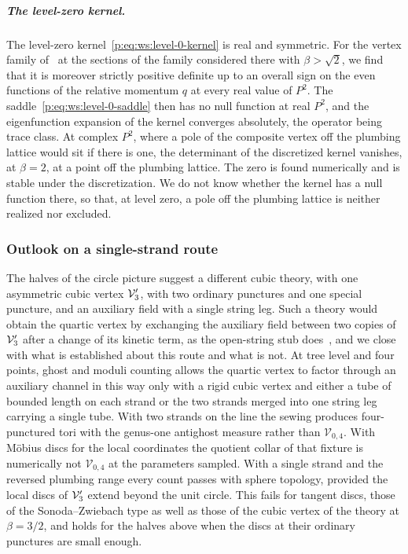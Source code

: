 \subparagraph{The level-zero kernel.}

The level-zero kernel~\eqref{p:eq:ws:level-0-kernel} is real and symmetric.
For the vertex family of~\cite{Erbin:2026:SL2CVerticesClosed} at the sections of the family considered there with $\beta > \sqrt{2}$, we find that it is moreover strictly positive definite up to an overall sign on the even functions of the relative momentum $q$ at every real value of $P^2$.
The saddle~\eqref{p:eq:ws:level-0-saddle} then has no null function at real $P^2$, and the eigenfunction expansion of the kernel converges absolutely, the operator being trace class.
At complex $P^2$, where a pole of the composite vertex off the plumbing lattice would sit if there is one, the determinant of the discretized kernel vanishes, at $\beta = 2$, at a point off the plumbing lattice.
The zero is found numerically and is stable under the discretization.
We do not know whether the kernel has a null function there, so that, at level zero, a pole off the plumbing lattice is neither realized nor excluded.

\subsubsection{Outlook on a single-strand route}
\label{p:sec:ws:single-strand}



The halves of the circle picture suggest a different cubic theory, with one asymmetric cubic vertex $\mathcal{V}_{3}'$, with two ordinary punctures and one special puncture, and an auxiliary field with a single string leg.
Such a theory would obtain the quartic vertex by exchanging the auxiliary field between two copies of $\mathcal{V}_{3}'$ after a change of its kinetic term, as the open-string stub does~\cite{Erbin:2024:OpenStringStub}, and we close with what is established about this route and what is not.
At tree level and four points, ghost and moduli counting allows the quartic vertex to factor through an auxiliary channel in this way only with a rigid cubic vertex and either a tube of bounded length on each strand or the two strands merged into one string leg carrying a single tube.
With two strands on the line the sewing produces four-punctured tori with the genus-one antighost measure rather than $\mathcal V_{0,4}$.
With Möbius discs for the local coordinates the quotient collar of that fixture is numerically not $\mathcal V_{0,4}$ at the parameters sampled.
With a single strand and the reversed plumbing range every count passes with sphere topology, provided the local discs of $\mathcal{V}_{3}'$ extend beyond the unit circle.
This fails for tangent discs, those of the Sonoda–Zwiebach type as well as those of the cubic vertex of the theory at $\beta = 3 / 2$, and holds for the halves above when the discs at their ordinary punctures are small enough.

